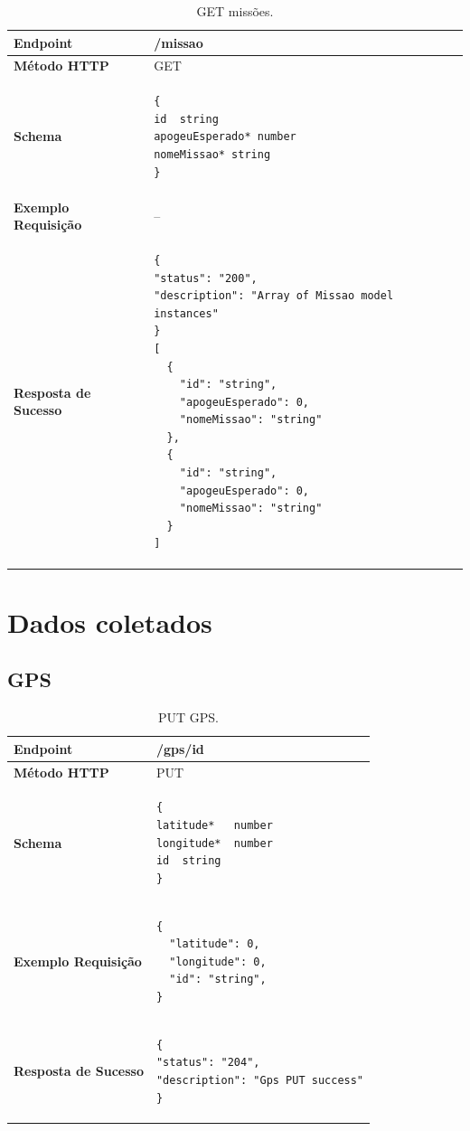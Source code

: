 \begin{apendicesenv}
\begin{table}[H]
\begin{tabular}{|l|l|}
\hline
\textbf{Endpoint}            & /missao \\ \hline
\textbf{Método HTTP}         & GET \\ \hline
\textbf{Schema}              & 
\begin{lstlisting}
{
id	string
apogeuEsperado*	number
nomeMissao*	string
}
\end{lstlisting} \\ \hline
\textbf{Exemplo Requisição}  & -- \\ \hline
\textbf{Resposta de Sucesso} &
\begin{lstlisting}
{
"status": "200",
"description": "Array of Missao model instances"
}
[
  {
    "id": "string",
    "apogeuEsperado": 0,
    "nomeMissao": "string"
  },
  {
    "id": "string",
    "apogeuEsperado": 0,
    "nomeMissao": "string"
  }
]
\end{lstlisting} \\ \hline
\end{tabular}
\caption{GET missões.}
\label{get_missao}
\end{table}


\section{Dados coletados}

\subsection{GPS}

\begin{table}[H]
\begin{tabular}{|l|l|}
\hline
\textbf{Endpoint}            & /gps/{id} \\ \hline
\textbf{Método HTTP}         & PUT \\ \hline
\textbf{Schema}              &  
\begin{lstlisting}
{
latitude*	number
longitude*	number
id	string
}
\end{lstlisting}\\ \hline
\textbf{Exemplo Requisição}  &  
\begin{lstlisting}
{
  "latitude": 0,
  "longitude": 0,
  "id": "string",
}
\end{lstlisting} \\ \hline
\textbf{Resposta de Sucesso} &
\begin{lstlisting}
{
"status": "204",
"description": "Gps PUT success"
}
\end{lstlisting}
\\ \hline
\end{tabular}
\caption{PUT GPS.}
\label{put_gps}
\end{table}


\end{apendicesenv}
